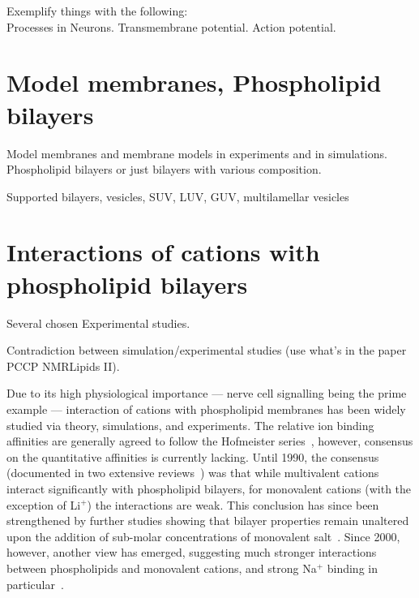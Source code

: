  Exemplify things with the following: \\
 Processes in Neurons. 
 Transmembrane potential. 
 Action potential. 


\section{Model membranes, Phospholipid bilayers }
\label{sec:modelmemb}

 Model membranes and membrane models in experiments and in simulations.
 Phospholipid bilayers or just bilayers with various composition. 

 Supported bilayers, vesicles, SUV, LUV, GUV, multilamellar vesicles




\section{Interactions of cations with phospholipid bilayers}

 Several chosen Experimental studies. 

 Contradiction between simulation/experimental studies 
 (use what's in the paper PCCP NMRLipids II). 


Due to its high physiological importance --- nerve cell signalling being the prime example ---
interaction of cations with phospholipid membranes
has been widely studied via theory, simulations, and experiments.
The relative ion binding affinities are generally agreed to
follow the Hofmeister series~\citep{eisenberg79,cevc90,tocanne90,binder02,celma07,leontidis09,vacha09a,klasczyk10,harb13}, 
however,
consensus on the quantitative affinities is currently lacking.
Until 1990, the consensus (documented in two extensive reviews~\citep{cevc90,tocanne90}) was that
while  multivalent cations interact significantly with phospholipid bilayers,
for monovalent cations (with the exception of Li$^+$) the interactions are weak.
This conclusion has since been strengthened by further
studies showing that bilayer properties remain unaltered upon the addition of sub-molar concentrations of monovalent 
salt~\citep{binder02,pabst07,filippov09}.
Since 2000, however, another view has emerged, suggesting much stronger interactions between phospholipids and monovalent cations, and strong Na$^{+}$ binding in particular~\citep{bockmann03,bockmann04,vacha09a,manyes05,manyes06,fukuma07,leontidis09,ferber11,morata12,klasczyk10,harb13}.

